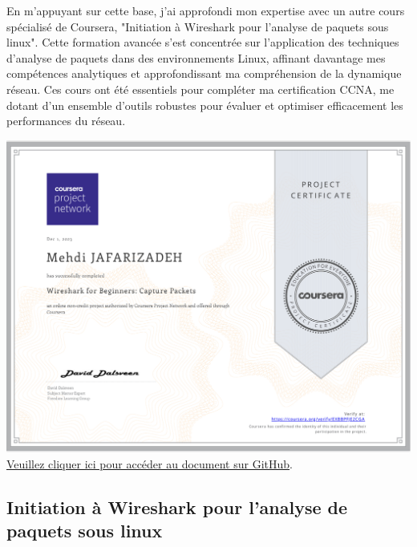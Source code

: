 \documentclass{article}
\begin{document}
    En m'appuyant sur cette base, j'ai approfondi mon expertise avec un autre cours spécialisé de Coursera, "Initiation à Wireshark pour l'analyse de paquets sous linux". Cette formation avancée s'est concentrée sur l'application des techniques d'analyse de paquets dans des environnements Linux, affinant davantage mes compétences analytiques et approfondissant ma compréhension de la dynamique réseau. Ces cours ont été essentiels pour compléter ma certification CCNA, me dotant d'un ensemble d'outils robustes pour évaluer et optimiser efficacement les performances du réseau.
    \newline
    \newline
    
        \begin{center}
            \includegraphics[width=\textwidth,height=\textheight,keepaspectratio]{../Document/Certificats de Fin de Cours/Wireshark for Beginners Capture Packets/Wireshark for Beginners Capture Packets.pdf}
            \footnotesize
             \href{https://github.com/jafarizadeh/CV---lettre/tree/00df58c41988ba7488536512caee235bdb5d570d/Document/Certificats%20de%20Fin%20de%20Cours/Wireshark%20for%20Beginners%20Capture%20Packets}{Veuillez cliquer ici pour accéder au document sur GitHub}.
        \end{center}

    \newpage
    
    \subsection{Initiation à Wireshark pour l'analyse de paquets sous linux}
    
\end{document}
